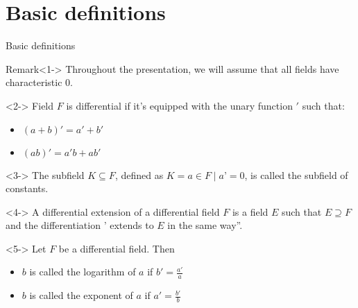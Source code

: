 \documentclass[8pt]{beamer}
\renewcommand{\|}{\ensuremath{\hspace{0.1cm} | \hspace{0.1cm}}}
\begin{document}
    \section{Basic definitions}
    \begin{frame}{Basic definitions}
        \begin{block}{Remark}<1->
            Throughout the presentation, we will assume that all fields have characteristic 0.
        \end{block}
        \begin{definition}<2->
            Field $F$ is differential if it's equipped with the unary function $'$ such that:
            \begin{itemize}
                \item $(a+b)' = a' + b'$
                \item $(ab)' = a'b + ab'$
            \end{itemize}
        \end{definition}
        \begin{definition}<3->
            The subfield $K \subseteq F$, defined as $K = { a \in F \mid a’ = 0 }$, is called the subfield of constants.
        \end{definition}
        \begin{definition}<4->
            A differential extension of a differential field $F$ is a field $E$ such that $E \supseteq F$ and the differentiation $’$ extends to $E$ in the same way”.
        \end{definition}
        \begin{definition}<5->
            Let $F$ be a differential field. Then
            \begin{itemize}
                \item $b$ is called the logarithm of $a$ if $b' = \frac{a'}{a}$
                \item $b$ is called the exponent of $a$ if $a' = \frac{b'}{b}$
            \end{itemize}
        \end{definition}
    \end{frame}
    
    
\end{document}
